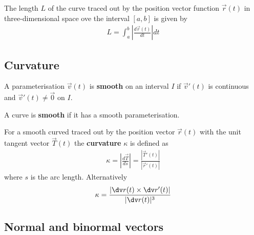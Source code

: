 \documentclass{article}
\begin{document}
\begin{theorem}
    The length $L$ of the curve traced out by the position vector function $\vec r(t)$ in three-dimensional space ove the interval
    $[a,b]$ is given by
    \begin{align*}
        L = \int_a^b \left|\frac{d\vec r(t)}{dt}\right| dt
    \end{align*}
\end{theorem}


\subsection{Curvature}


\begin{definition}
    A parameterisation $\vec v(t)$ is \textbf{smooth} on an interval $I$ if $\vec v'(t)$ is continuous and $\vec v'(t) \not = \vec 0$ on $I$.
\end{definition}
\begin{definition}
    A curve is \textbf{smooth} if it has a smooth parameterisation.
\end{definition}
\begin{definition}
    For a smooth curved traced out by the position vector $\vec r(t)$ with the unit tangent vector
    $\vec T(t)$ the \textbf{curvature} $\kappa$ is defined as
    \begin{align*}
        \kappa = \left|\frac{d\vec T}{ds}\right|=\frac{\left| \vec T'(t)\right|}{\left|\vec r'(t)\right|}
    \end{align*}
    where $s$ is the arc length.
    Alternatively
    \begin{align*}
        \kappa = \frac{\left|\dv r(t) \times \dv r'(t)\right|}{|\dv r(t)|^3}
    \end{align*}
\end{definition}


\subsection{Normal and binormal vectors}
\end{document}

